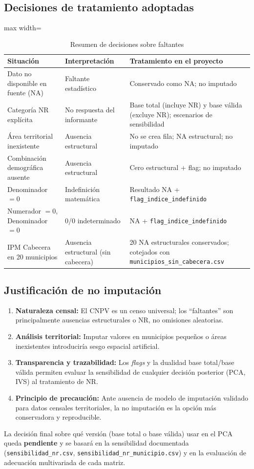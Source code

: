 \subsection{Decisiones de tratamiento adoptadas}
\label{sec:decisiones_tratamiento}

\begin{table}[htbp]
\centering
\caption{Resumen de decisiones sobre faltantes}
\label{tab:decisiones_faltantes}
\begin{adjustbox}{max width=\textwidth}
\begin{tabular}{@{}lll@{}}
\toprule
\textbf{Situación} & \textbf{Interpretación} & \textbf{Tratamiento en el proyecto} \\
\midrule
Dato no disponible en fuente (NA) & Faltante estadístico & Conservado como NA; no imputado \\
Categoría NR explícita & No respuesta del informante & Base total (incluye NR) y base válida (excluye NR); escenarios de sensibilidad \\
Área territorial inexistente & Ausencia estructural & No se crea fila; NA estructural; no imputado \\
Combinación demográfica ausente & Ausencia estructural & Cero estructural + flag; no imputado \\
Denominador $=0$ & Indefinición matemática & Resultado NA + \texttt{flag\_indice\_indefinido} \\
Numerador $=0$, Denominador $=0$ & 0/0 indeterminado & NA + \texttt{flag\_indice\_indefinido} \\
IPM Cabecera en 20 municipios & Ausencia estructural (sin cabecera) & 20 NA estructurales conservados; cotejados con \texttt{municipios\_sin\_cabecera.csv} \\
\bottomrule
\end{tabular}
\end{adjustbox}
\end{table}

\subsection{Justificación de no imputación}
\label{sec:justificacion_no_imputacion}

\begin{enumerate}
    \item \textbf{Naturaleza censal:} El CNPV es un censo universal; los ``faltantes'' son principalmente ausencias estructurales o NR, no omisiones aleatorias.
    \item \textbf{Análisis territorial:} Imputar valores en municipios pequeños o áreas inexistentes introduciría sesgo espacial artificial.
    \item \textbf{Transparencia y trazabilidad:} Los \textit{flags} y la dualidad base total/base válida permiten evaluar la sensibilidad de cualquier decisión posterior (PCA, IVS) al tratamiento de NR.
    \item \textbf{Principio de precaución:} Ante ausencia de modelo de imputación validado para datos censales territoriales, la no imputación es la opción más conservadora y reproducible.
\end{enumerate}

La decisión final sobre qué versión (base total o base válida) usar en el PCA queda \textbf{pendiente} y se basará en la sensibilidad documentada (\texttt{sensibilidad\_nr.csv}, \texttt{sensibilidad\_nr\_municipio.csv}) y en la evaluación de adecuación multivariada de cada matriz.


